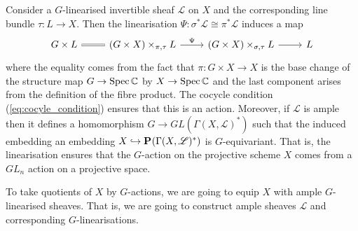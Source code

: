 \documentclass[12pt]{ociamthesis}  %
\begin{document}
\begin{example}\label{ex:linearised_action_on_bundle}
  Consider a $G$-linearised invertible sheaf $\mathscr L$ on $X$
  and the corresponding line bundle $\tau : L\to X$. Then the linearisation
  $\Psi : \sigma^*\mathscr L \cong \pi^*\mathscr L$ induces
  a map
  \begin{equation*}
    \begin{tikzcd}
      {G\times L} & {(G\times X)\times_{\pi,\tau} L} & {(G\times X)\times_{\sigma,\tau} L} & L
      \arrow[Rightarrow, no head, from=1-1, to=1-2]
      \arrow["\Psi", from=1-2, to=1-3]
      \arrow[from=1-3, to=1-4]
    \end{tikzcd}
  \end{equation*}
  where the equality comes from the fact that $\pi : G\times X \to X$
  is the base change of the structure map $G\to\operatorname{Spec}\mathbb C$
  by $X\to\operatorname{Spec}\mathbb C$ and the last component arises from the
  definition of the fibre product. The cocycle condition
  (\ref{eq:cocyle_condition}) ensures that this is an action. \cite[84]{huybrechts2010}
  Moreover, if $\mathscr L$ is ample then it defines a homomorphism
  $G\to GL(\Gamma(X,\mathscr L)^*)$ such that the induced embedding
  an embedding $X\hookrightarrow\mathbf{P}^{}_{}(\Gamma(X,\mathscr L)^*)$ is
  $G$-equivariant. \cite[Remark 5.20]{hoskins2016} That is, the
  linearisation ensures that the $G$-action on the projective
  scheme $X$ comes from a $GL_n$ action on a projective space.
\end{example}

To take quotients of $X$ by $G$-actions, we are going to equip
$X$ with ample $G$-linearised sheaves. That is, we are
going to construct ample sheaves $\mathscr L$ and corresponding
$G$-linearisations.
\end{document}
